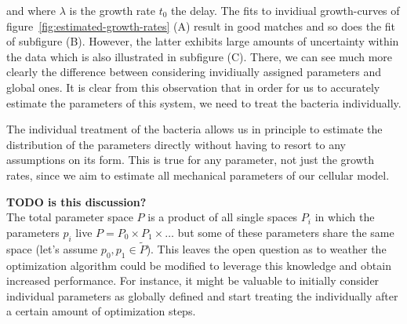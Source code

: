 \documentclass{article}
\begin{document}
and where $\lambda$ is the growth rate $t_0$ the delay.
The fits to invidiual growth-curves of figure~\ref{fig:estimated-growth-rates} (A) result in good
matches and so does the fit of subfigure (B).
However, the latter exhibits large amounts of uncertainty within the data which is also illustrated
in subfigure (C).
There, we can see much more clearly the difference between considering invidiually assigned
parameters and global ones.
It is clear from this observation that in order for us to accurately estimate the parameters of this
system, we need to treat the bacteria individually.

The individual treatment of the bacteria allows us in principle to estimate the distribution of the
parameters directly without having to resort to any assumptions on its form.
This is true for any parameter, not just the growth rates, since we aim to estimate all mechanical
parameters of our cellular model.

\textbf{TODO is this discussion?}\\
The total parameter space $P$ is a product of all single spaces $P_i$ in which the parameters
$p_i$ live $P=P_0\times P_1\times\dots$ but some of these parameters share the same space (let's
assume $p_0,p_1\in \tilde{P}$).
This leaves the open question as to weather the optimization algorithm could be modified to leverage
this knowledge and obtain increased performance.
For instance, it might be valuable to initially consider individual parameters as globally defined
and start treating the individually after a certain amount of optimization steps.

\end{document}
